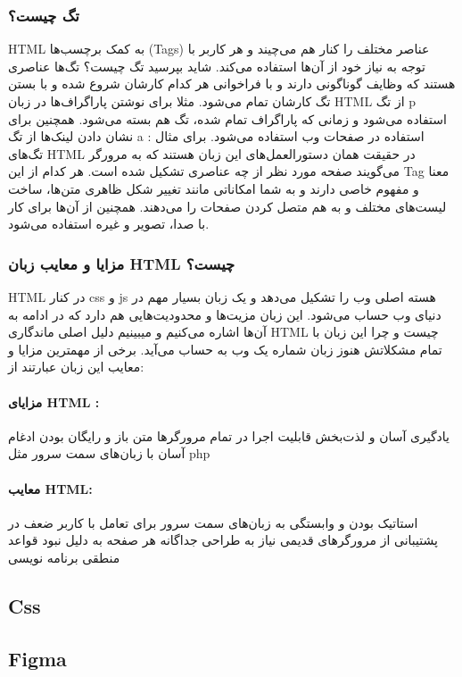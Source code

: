 \subsubsection{تگ چیست؟}
HTML به کمک برچسب‌‌ها (Tags) عناصر مختلف را کنار هم می‌چیند و هر کاربر با توجه به نیاز خود از آن‌ها استفاده می‌کند. شاید بپرسید تگ چیست؟ تگ‌ها عناصری هستند که وظایف گوناگونی دارند و با فراخوانی هر کدام کارشان شروع شده و با بستن تگ کارشان تمام می‌شود. مثلا برای نوشتن پاراگراف‌ها در زبان HTML از تگ p استفاده می‌شود و زمانی که پاراگراف تمام شده، تگ هم بسته می‌شود. همچنین برای نشان دادن لینک‌ها از تگ a استفاده در صفحات وب استفاده می‌شود. برای مثال :
تگ‌های HTML در حقیقت همان دستورالعمل‌های این زبان هستند که به مرورگر می‌گویند صفحه مورد نظر از چه عناصری تشکیل شده است. هر کدام از این Tag معنا و مفهوم خاصی دارند و به شما امکاناتی مانند تغییر شکل ظاهری متن‌ها، ساخت لیست‌های مختلف و به هم متصل کردن صفحات را می‌دهند. همچنین از آن‌ها برای کار با صدا، تصویر و غیره استفاده می‌شود.


\subsubsection{مزایا و معایب زبان HTML چیست؟}
HTML در کنار css و js هسته اصلی وب را تشکیل می‌دهد و یک زبان بسیار مهم در دنیای وب حساب می‌شود. این زبان مزیت‌ها و محدودیت‌هایی هم دارد که در ادامه به آن‌ها اشاره می‌کنیم و میبینیم دلیل اصلی ماندگاری HTML چیست و چرا این زبان با تمام مشکلاتش هنوز زبان شماره یک وب به حساب می‌آید. برخی از مهمترین مزایا و معایب این زبان عبارتند از:

\paragraph{مزایای HTML :}
یادگیری آسان و لذت‌بخش
قابلیت اجرا در تمام مرورگرها
متن باز و رایگان بودن
ادغام آسان با زبان‌های سمت سرور مثل 
php

\paragraph{معایب HTML:}
استاتیک بودن و وابستگی به زبان‌های سمت سرور برای تعامل با کاربر
ضعف در پشتیبانی از مرورگرهای قدیمی
نیاز به طراحی جداگانه هر صفحه به دلیل نبود قواعد منطقی برنامه نویسی


\subsection{Css}
\subsection{Figma}

